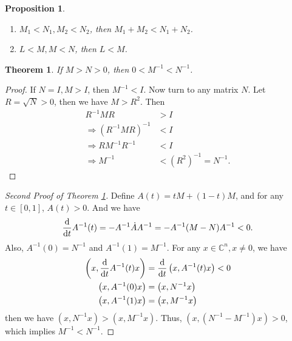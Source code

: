 \documentclass[11pt]{book}
\newtheorem{theorem}{Theorem}[section]
\newtheorem{proposition}{Proposition}[section]
\theoremstyle{definition}
\numberwithin{equation}{chapter}
\begin{document}
\medskip

\begin{proposition}
~\begin{enumerate}[label=(\alph*)]
    \item $M_1 < N_1, M_2 < N_2$, then $M_1 + M_2 < N_1 + N_2$.
    \item $L < M, M < N$, then $L < M$.
\end{enumerate}
\end{proposition}

\medskip

\begin{theorem}\label{inverse_of_positive_matrix}
If $M > N > 0$, then $0 < M^{-1} < N^{-1}$.
\end{theorem}
\begin{proof}
If $N = I, M > I$, then $M^{-1} < I$. Now turn to any matrix $N$. Let $R = \sqrt{N} > 0$, then we have $M > R^2$. Then
\begin{align*}
    R^{-1} M R & > I \\
    \Rightarrow \left(R^{-1} M R\right)^{-1} & < I \\
    \Rightarrow R M^{-1} R^{-1} & < I \\
    \Rightarrow M^{-1} & < \left(R^2\right)^{-1} = N^{-1}.
\end{align*}
\end{proof}

\begin{proof}[Second Proof of Theorem \ref{inverse_of_positive_matrix}]
Define $A(t) = tM + (1-t)M$, and for any $t\in [0,1]$, $A(t) > 0$. And we have 
\begin{align*}
    \dv{}{t}A^{-1}(t) = - A^{-1} \dot{A} A^{-1} = - A^{-1} (M - N) A^{-1} < 0.
\end{align*}
Also, $A^{-1}(0) = N^{-1}$  and $A^{-1}(1) = M^{-1}$. For any $x\in \mathbb{C}^n, x\neq 0$, we have 
\begin{align*}
    \left(x, \dv{}{t}A^{-1}(t)x \right) & = \dv{}{t} \left(x, A^{-1}(t)x \right) < 0 \\
    \left(x, A^{-1}(0)x \right) & = \left(x, N^{-1}x \right) \\
    \left(x, A^{-1}(1)x \right) & = \left(x, M^{-1}x \right)
\end{align*}
then we have $\left(x, N^{-1}x \right) > \left(x, M^{-1}x \right)$. Thus, $\left(x, (N^{-1} - M^{-1})x \right) > 0$, which implies $M^{-1} < N^{-1}$.
\end{proof}

\medskip
\end{document}
